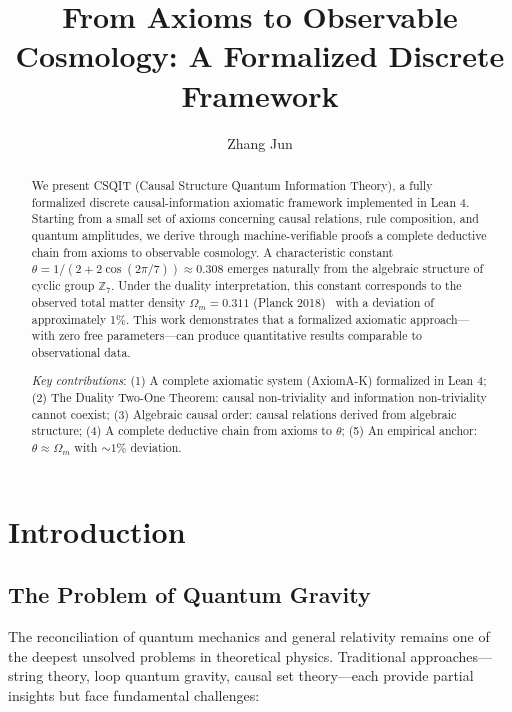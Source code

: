 \documentclass[aps,prd,twocolumn,nofootinbib,floatfix]{revtex4-2}
\title{From Axioms to Observable Cosmology: A Formalized Discrete Framework}
\author{Zhang Jun}
\affiliation{New Beginning Universe Research Group (Independent Researcher)}
\begin{document}
\maketitle

\begin{abstract}
We present CSQIT (Causal Structure Quantum Information Theory), a fully formalized discrete causal-information axiomatic framework implemented in Lean 4. Starting from a small set of axioms concerning causal relations, rule composition, and quantum amplitudes, we derive through machine-verifiable proofs a complete deductive chain from axioms to observable cosmology. A characteristic constant $\theta = 1/(2+2\cos(2\pi/7)) \approx 0.308$ emerges naturally from the algebraic structure of cyclic group $\mathbb{Z}_7$. Under the duality interpretation, this constant corresponds to the observed total matter density $\Omega_m = 0.311$ (Planck 2018)~\cite{Planck2018} with a deviation of approximately 1\%. This work demonstrates that a formalized axiomatic approach---with zero free parameters---can produce quantitative results comparable to observational data.

\textit{Key contributions}: (1) A complete axiomatic system (AxiomA-K) formalized in Lean 4; (2) The Duality Two-One Theorem: causal non-triviality and information non-triviality cannot coexist; (3) Algebraic causal order: causal relations derived from algebraic structure; (4) A complete deductive chain from axioms to $\theta$; (5) An empirical anchor: $\theta \approx \Omega_m$ with $\sim 1\%$ deviation.
\end{abstract}


\section{Introduction}

\subsection{The Problem of Quantum Gravity}

The reconciliation of quantum mechanics and general relativity remains one of the deepest unsolved problems in theoretical physics. Traditional approaches---string theory, loop quantum gravity, causal set theory---each provide partial insights but face fundamental challenges:
\end{document}
